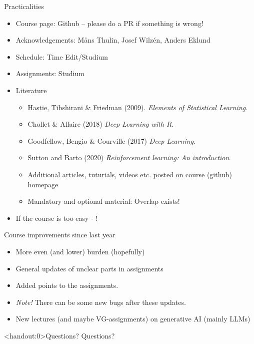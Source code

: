 \documentclass[10pt]{beamer}
\begin{document}
\begin{frame}{Practicalities}

\begin{itemize}
\item Course page: Github -- please do a PR if something is wrong!\pause
\item Acknowledgements: M{\aa}ns Thulin, Josef Wilzén, Anders Eklund\pause
\item Schedule: Time Edit/Studium
\item Assignments: Studium\pause
\item Literature
\begin{itemize}
\item Hastie, Tibshirani \& Friedman (2009). \emph{Elements of Statistical Learning}.
\item Chollet \& Allaire (2018) \emph{Deep Learning with R}.
\item Goodfellow, Bengio \& Courville (2017) \emph{Deep Learning}.
\item Sutton and Barto (2020) \emph{Reinforcement learning: An introduction}
\item Additional articles, tuturials, videos etc. posted on course (github) homepage
\item Mandatory and optional material: Overlap exists!
\end{itemize}
\pause
\item If the course is too easy - !
\end{itemize}

\end{frame}



\begin{frame}{Course improvements since last year}

\begin{itemize}
\item More even (and lower) burden (hopefully)
\item General updates of unclear parts in assignments
\item Added points to the assignments.
\item \emph{Note!} There can be some new bugs after these updates.
\item New lectures (and maybe VG-assignments) on generative AI (mainly LLMs)
\end{itemize}

\end{frame}

\begin{frame}<handout:0>{Questions?}
Questions?
\end{frame}
\end{document}
